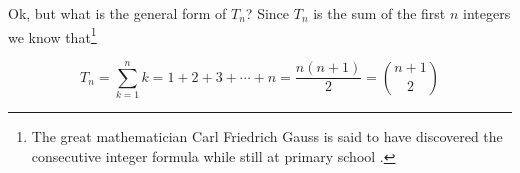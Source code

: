 \documentclass{article}
\theoremstyle{definition}
\begin{document}

\bigskip
\noindent
Ok, but what is the general form of $T_n$?  Since $T_n$ is the
sum of the first $n$ integers we know that\footnote{The great
mathematician Carl Friedrich Gauss is said to have discovered the
consecutive integer formula while still at primary school
\cite{gauss_on_arithmetic_sequences}.}

\medskip
\begin{equation}
T_{n} = \sum _{k=1}^{n} k=1+2+3+\dotsb +n = {\frac {n(n+1)}{2}} = {n+1 \choose 2}
\label{eqn:T_n}
\end{equation}
\end{document}
